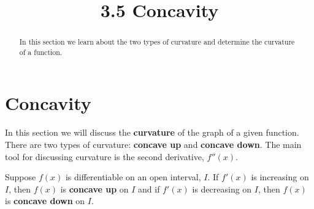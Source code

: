 \documentclass[handout]{ximera}
\title{3.5 Concavity}
\begin{document}
\begin{abstract}
In this section we learn about the two types of curvature and determine the curvature of a function.
\end{abstract}

\maketitle

\section{Concavity}

In this section we will discuss the {\bf curvature} of the graph of a given function. 
There are two types of curvature: {\bf concave up} and {\bf concave down}.  
The main tool for discussing curvature is the second derivative, $f''(x)$.





\begin{definition}[Concavity]
Suppose $f(x)$ is differentiable on an open interval, $I$.
If $f'(x)$ is increasing on $I$, then $f(x)$ is \textbf{concave up} on $I$ and
if $f'(x)$ is decreasing on $I$, then $f(x)$ is \textbf{concave down} on $I$.
\end{definition} 


\begin{image}
\end{image}


\end{document}
